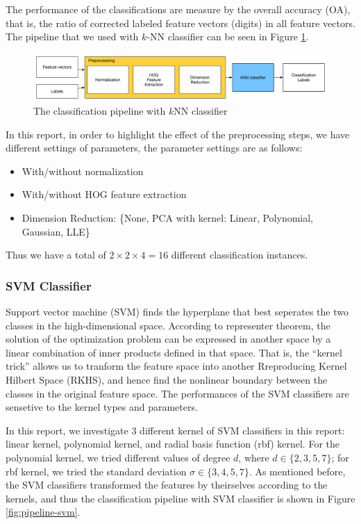 \documentclass[12pt]{article}
\begin{document}
The performance of the classifications are measure by the overall accuracy (OA), that is, the ratio of corrected labeled feature vectors (digits) in all feature vectors. The pipeline that we used with $k$-NN classifier can be seen in Figure \ref{fig:pipeline-knn}.

\begin{figure}[tbp]
	\centering
	\includegraphics[width =\textwidth]{pipeline-knn}		
	\caption{The classification pipeline with $k$NN classifier}
	\label{fig:pipeline-knn}
\end{figure}

In this report, in order to highlight the effect of the preprocessing steps, we have different settings of parameters, the parameter settings are as follows:
\begin{itemize}
	\item With/without normalization
	\item With/without HOG feature extraction
	\item Dimension Reduction: \{None, PCA with kernel: {Linear, Polynomial, Gaussian}, LLE\}
\end{itemize}
Thus we have a total of $2 \times 2 \times 4 = 16$ different classification instances.

\subsubsection{SVM Classifier}

Support vector machine (SVM) finds the hyperplane that best seperates the two classes in the high-dimensional space. According to representer theorem, the solution of the optimization problem can be expressed in another space by a linear combination of inner products defined in that space. That is, the ``kernel trick'' allows us to tranform the feature space into another Rreproducing Kernel Hilbert Space (RKHS), and hence find the nonlinear boundary between the classes in the original feature space. The performances of the SVM classifiers are sensetive to the kernel types and parameters.

In this report, we investigate 3 different kernel of SVM classifiers in this report: linear kernel, polynomial kernel, and radial basis function (rbf) kernel. For the polynomial kernel, we tried different values of degree $d$, where $d \in \{2,3,5,7\}$; for rbf kernel, we tried the standard deviation $\sigma \in \{3, 4, 5, 7\}$. As mentioned before, the SVM classifiers transformed the features by theirselves according to the kernels, and thus the classification pipeline with SVM classifier is shown in Figure \ref{fig:pipeline-svm}.
\end{document}
